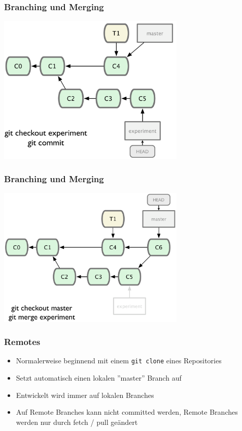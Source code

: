 \begin{frame}
  \frametitle{Branching und Merging}
  \begin{center}
    \includegraphics[width=9cm]{img/branch_6.pdf}
  \end{center}
\end{frame}

\begin{frame}
  \frametitle{Branching und Merging}
  \begin{center}
    \includegraphics[width=9cm]{img/branch_7.pdf}
  \end{center}
\end{frame}

\begin{frame}
  \frametitle{Remotes}
  \begin{itemize}
    \item Normalerweise beginnend mit einem {\tt git clone} eines Repositories
    \item Setzt automatisch einen lokalen ''master'' Branch auf
    \item Entwickelt wird immer auf lokalen Branches
    \item Auf Remote Branches kann nicht committed werden, Remote Branches werden nur durch fetch / pull geändert
  \end{itemize}
\end{frame}

